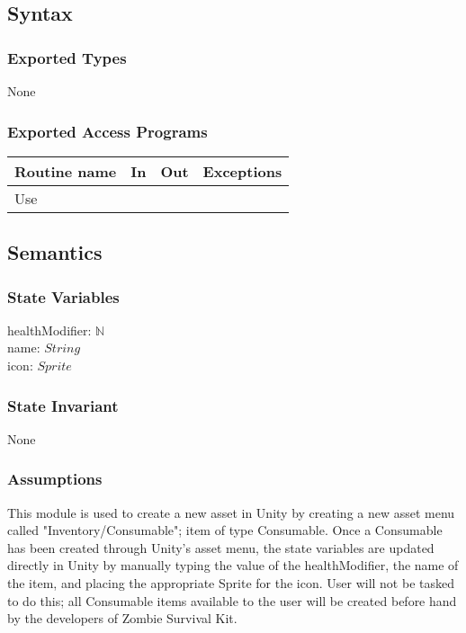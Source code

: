 \documentclass[12pt]{article}
\begin{document}
\subsection* {Syntax}

\subsubsection* {Exported Types}

None

\subsubsection* {Exported Access Programs}

\begin{tabular}{| l | l | l | l |}
\hline
\textbf{Routine name} & \textbf{In} & \textbf{Out} & \textbf{Exceptions}\\
\hline
Use & ~ & ~ & ~\\
\hline
\end{tabular}

\subsection* {Semantics}

\subsubsection* {State Variables}

healthModifier: $\mathbb{N}$\\
name: $String$\\
icon: $Sprite$

\subsubsection* {State Invariant}

None

\subsubsection* {Assumptions}

This module is used to create a new asset in Unity by creating a new asset menu called "Inventory/Consumable"; item of type Consumable. Once a Consumable has been created through Unity's asset menu, the state variables are updated directly in Unity by manually typing the value of the healthModifier, the name of the item, and placing the appropriate Sprite for the icon. User will not be tasked to do this; all Consumable items available to the user will be created before hand by the developers of Zombie Survival Kit.
\end{document}

